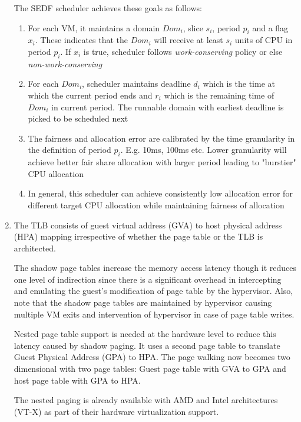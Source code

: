 \documentclass[11pt,a4paper,oneside]{article}
\begin{document}
\begin{enumerate}
		The SEDF scheduler achieves these goals as follows:
		\begin{enumerate}
			\item For each VM, it maintains a domain $Dom_i$, slice $s_i$, period $p_i$ and a flag $x_i$. These indicates that the $Dom_i$ will receive at least $s_i$ units of CPU in period $p_i$. If $x_i$ is true, scheduler follows \emph{work-conserving} policy or else \emph{non-work-conserving}
			\item For each $Dom_i$, scheduler maintains deadline $d_i$ which is the time at which the current period ends and $r_i$ which is the remaining time of $Dom_i$ in current period. The runnable domain with earliest deadline is picked to be scheduled next
			\item The fairness and allocation error are calibrated by the time granularity in the definition of period $p_i$. E.g. 10ms, 100ms etc. Lower granularity will achieve better fair share allocation with larger period leading to "burstier" CPU allocation
			\item In general, this scheduler can achieve consistently low allocation error for different target CPU allocation while maintaining fairness of allocation
		\end{enumerate}
 		\item The TLB consists of guest virtual address (GVA) to host physical address (HPA) mapping irrespective of whether the page table or the TLB is architected.
 		
 		The shadow page tables increase the memory access latency though it reduces one level of indirection since there is a significant overhead in intercepting and emulating the guest's modification of page table by the hypervisor. Also, note that the shadow page tables are maintained by hypervisor causing multiple VM exits and intervention of hypervisor in case of page table writes.
 		
 		Nested page table support is needed at the hardware level to reduce this latency caused by shadow paging. It uses a second page table to translate Guest Physical Address (GPA) to HPA. The page walking now becomes two dimensional with two page tables: Guest page table with GVA to GPA and host page table with GPA to HPA. 
 		
 		The nested paging is already available with AMD and Intel architectures (VT-X) as part of their hardware virtualization support.
 		

\end{enumerate}
\end{document}
